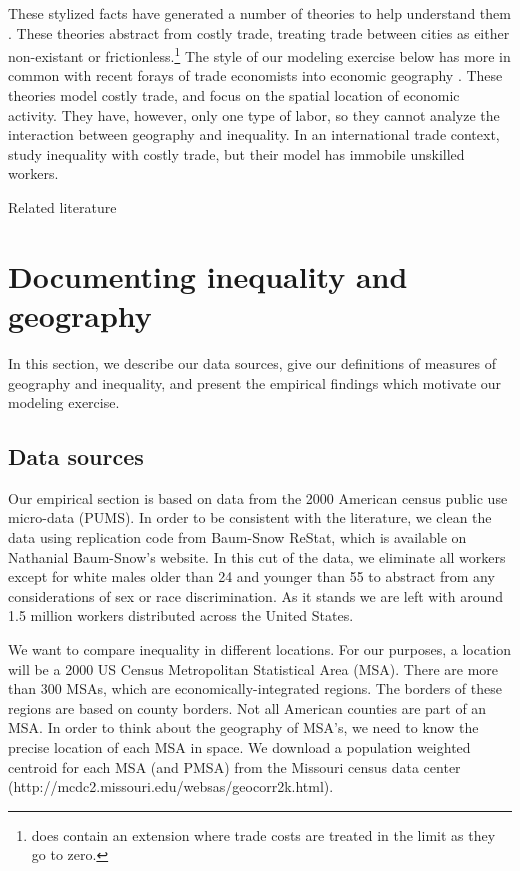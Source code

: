 \documentclass{article}
\begin{document}
These stylized facts have generated a number of theories to help understand them \citep{davis2012spatial,davis2014comparative,baum2012understanding,combes2012sorting}.  These theories abstract from costly trade, treating trade between cities as either non-existant or frictionless.\footnote{\citet{davis2012spatial} does contain an extension where trade costs are treated in the limit as they go to zero.}  The style of our modeling exercise below has more in common with recent forays of trade economists into economic geography \citep{allen2014trade,desmet2014geography}.  These theories model costly trade, and focus on the spatial location of economic activity. They have, however, only one type of labor, so they cannot analyze the interaction between geography and inequality.  In an international trade context, \citet{fujita2006globalization} study inequality with costly trade, but their model has immobile unskilled workers.


Related literature

\section{Documenting inequality and geography}

In this section, we describe our data sources, give our definitions of measures of geography and inequality, and present the empirical findings which motivate our modeling exercise.  
\subsection{Data sources}

Our empirical section is based on data from the 2000 American census public use micro-data (PUMS).  In order to be consistent with the literature, we clean the data using replication code from Baum-Snow ReStat, which is available on Nathanial Baum-Snow's website.  In this cut of the data, we eliminate all workers except for white males older than 24 and younger than 55 to abstract from any considerations of sex or race discrimination.  As it stands we are left with around 1.5 million workers distributed across the United States.

We want to compare inequality in different locations.  For our purposes, a location will be a 2000 US Census Metropolitan Statistical Area (MSA).  There are more than 300 MSAs, which are economically-integrated regions.  The borders of these regions are based on county borders.  Not all American counties are part of an MSA.  In order to think about the geography of MSA's, we need to know the precise location of each MSA in space.  We download a population weighted centroid for each MSA (and PMSA) from the Missouri census data center (http://mcdc2.missouri.edu/websas/geocorr2k.html).
\end{document}
